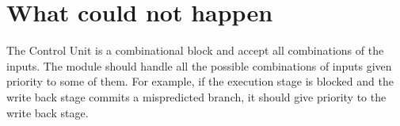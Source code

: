 \section{What could not happen}

The Control Unit is a combinational block and accept all combinations of the inputs.
The module should handle all the possible combinations of inputs given priority to some of them.
For example, if the execution stage is blocked and the write back stage commits a mispredicted branch, it should give priority to the write back stage.
